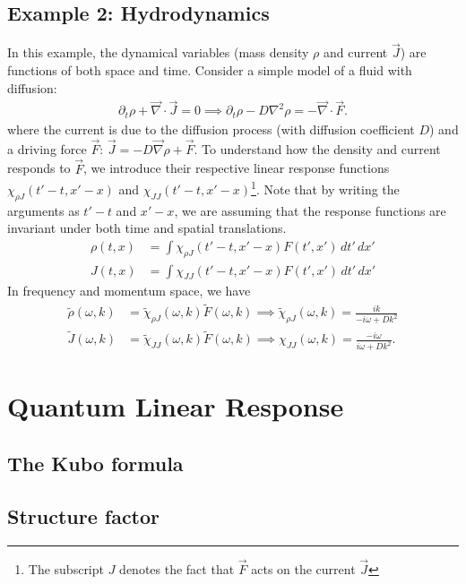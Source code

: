 \documentclass[reprint,
nofootinbib,
amsmath,amssymb,
aps]{revtex4-1}
\newcommand{\p}{\partial}
\newcommand{\f}[2]{\frac{#1}{#2}}
\begin{document}
\subsection{Example 2: Hydrodynamics}

In this example, the dynamical variables (mass density $\rho$ and current $\vec{J}$) are functions of both space and time. Consider a simple model of a fluid with diffusion:
\begin{align*}
\p_t \rho + \vec\nabla \cdot \vec{J} = 0 \implies \p_t \rho - D \nabla^2 \rho = - \vec\nabla \cdot \vec{F}.
\end{align*}
where the current is due to the diffusion process (with diffusion coefficient $D$) and a driving force $\vec{F}$: $\vec{J} = -D \vec\nabla \rho + \vec{F}$. To understand how the density and current responds to $\vec{F}$, we introduce their respective linear response functions $\chi_{\rho J}(t'-t, x'-x)$ and $\chi_{JJ}(t'-t,x'-x)$\footnote{The subscript $J$ denotes the fact that $\vec{F}$ acts on the current $\vec{J}$}. Note that by writing the arguments as $t'-t$ and $x'-x$, we are assuming that the response functions are invariant under both time and spatial translations. 
\begin{align*}
\rho(t,x) &= \int \chi_{\rho J} (t'-t,x'-x) F(t',x') \,dt' \, dx'  \\
J(t,x) &= \int \chi_{J J} (t'-t,x'-x) F(t',x') \,dt' \, dx' 
\end{align*}
In frequency and momentum space, we have 
\begin{align*}
\tilde{\rho}(\omega, k) &= \tilde{\chi}_{\rho J}(\omega,k) \tilde{F}(\omega,k) \implies \tilde{\chi}_{\rho J}(\omega,k) =  \f{ ik}{-i\omega + Dk^2} \\
\tilde{J}(\omega, k) &= \tilde{\chi}_{J J}(\omega,k) \tilde{F}(\omega,k) \implies \chi_{JJ}(\omega,k) = \f{-i\omega}{i\omega + Dk^2}.
\end{align*}








\section{Quantum Linear Response}

\subsection{The Kubo formula}

\subsection{Structure factor}
\end{document}
